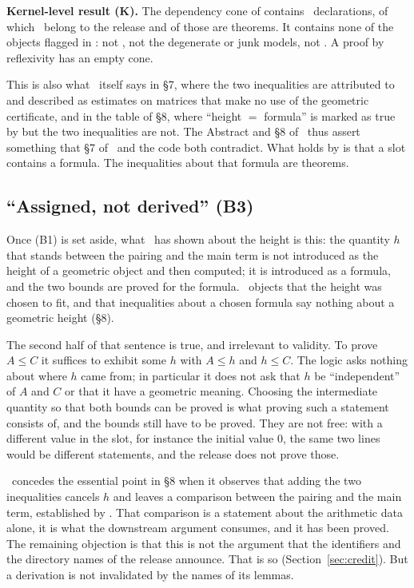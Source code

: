 \begin{verdictbox}
\textbf{Kernel-level result (K).} The dependency cone of  contains \NdivClausesAll\ declarations, of which \NdivClausesProj\ belong to the release and \textbf{\NdivClausesThm} of those are theorems.
It contains none of the objects flagged in \N: not , not the degenerate or junk models, not . A proof by reflexivity has an empty cone.
\end{verdictbox}

This is also what \N\ itself says in \S7, where the two inequalities are attributed to  and described as estimates on matrices that make no use of the geometric certificate, and in the table of \S8, where ``height $=$ formula'' is marked as true by  but the two inequalities are not.
The Abstract and \S8 of \N\ thus assert something that \S7 of \N\ and the code both contradict.
What holds by  is that a slot contains a formula. The inequalities about that formula are theorems.

\subsection{``Assigned, not derived'' (B3)}
\label{sec:assigned}

Once (B1) is set aside, what \N\ has shown about the height is this: the quantity $h$ that stands between the pairing and the main term is not introduced as the height of a geometric object and then computed; it is introduced as a formula, and the two bounds are proved for the formula.
\N\ objects that the height was chosen to fit, and that inequalities about a chosen formula say nothing about a geometric height (\S8).

The second half of that sentence is true, and irrelevant to validity. To prove $A \le C$ it suffices to exhibit some $h$ with $A \le h$ and $h \le C$.
The logic asks nothing about where $h$ came from; in particular it does not ask that $h$ be ``independent'' of $A$ and $C$ or that it have a geometric meaning.
Choosing the intermediate quantity so that both bounds can be proved is what proving such a statement consists of, and the bounds still have to be proved.
They are not free: with a different value in the slot, for instance the initial value $0$, the same two lines would be different statements, and the release does not prove those.

\N\ concedes the essential point in \S8 when it observes that adding the two inequalities cancels $h$ and leaves a comparison between the pairing and the main term, established by .
That comparison is a statement about the arithmetic data alone, it is what the downstream argument consumes, and it has been proved.
The remaining objection is that this is not the argument that the identifiers and the directory names of the release announce.
That is so (Section~\ref{sec:credit}). But a derivation is not invalidated by the names of its lemmas.

